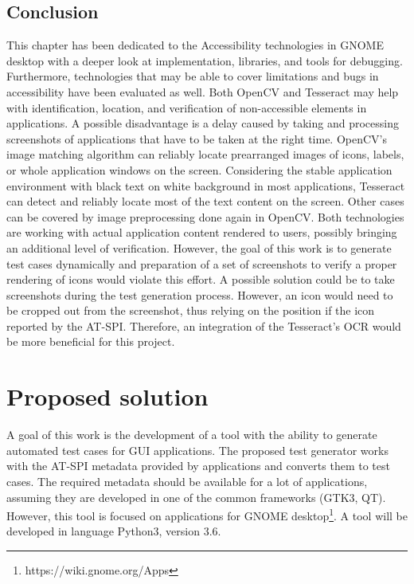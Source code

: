 \section{Conclusion}\label{ocr_conclusion}
This chapter has been dedicated to the Accessibility technologies in GNOME desktop with a deeper look at implementation, libraries, and tools for debugging. Furthermore, technologies that may be able to cover limitations and bugs in accessibility have been evaluated as well. Both OpenCV and Tesseract may help with identification, location, and verification of non-accessible elements in applications. A possible disadvantage is a delay caused by taking and processing screenshots of applications that have to be taken at the right time. OpenCV's image matching algorithm can reliably locate prearranged images of icons, labels, or whole application windows on the screen. Considering the stable application environment with black text on white background in most applications, Tesseract can detect and reliably locate most of the text content on the screen. Other cases can be covered by image preprocessing done again in OpenCV. Both technologies are working with actual application content rendered to users, possibly bringing an additional level of verification. However, the goal of this work is to generate test cases dynamically and preparation of a set of screenshots to verify a proper rendering of icons would violate this effort. A possible solution could be to take screenshots during the test generation process. However, an icon would need to be cropped out from the screenshot, thus relying on the position if the icon reported by the AT-SPI. Therefore, an integration of the Tesseract's OCR would be more beneficial for this project.

\chapter{Proposed solution}\label{proposed_solution}
A goal of this work is the development of a tool with the ability to generate automated test cases for GUI applications. The proposed test generator works with the AT-SPI metadata provided by applications and converts them to test cases. The required metadata should be available for a lot of applications, assuming they are developed in one of the common frameworks (GTK3, QT). However, this tool is focused on applications for GNOME desktop\footnote{https://wiki.gnome.org/Apps}. A tool will be developed in language Python3, version 3.6.

